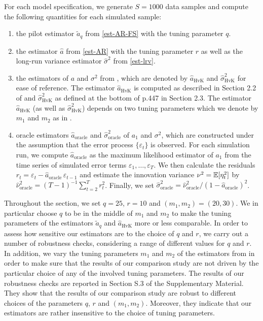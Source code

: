 For each model specification, we generate $S=1000$ data samples and compute the following quantities for each simulated sample: 
\begin{enumerate}[label=(\roman*),leftmargin=0.9cm]
\item the pilot estimator $\widetilde{a}_q$ from \eqref{est-AR-FS} with the tuning parameter $q$.
\item the estimator $\widehat{a}$ from \eqref{est-AR} with the tuning parameter $r$ as well as the long-run variance estimator $\widehat{\sigma}^2$ from \eqref{est-lrv}. 
\item the estimators of $a$ and $\sigma^2$ from \cite{Hall2003}, which are denoted by $\widehat{a}_{\text{HvK}}$ and $\widehat{\sigma}^2_{\text{HvK}}$ for ease of reference. The estimator $\widehat{a}_{\text{HvK}}$ is computed as described in Section 2.2 of \cite{Hall2003} and $\widehat{\sigma}^2_{\text{HvK}}$ as defined at the bottom of p.447 in Section 2.3. The estimator $\widehat{a}_{\text{HvK}}$ (as well as $\widehat{\sigma}^2_{\text{HvK}}$) depends on two tuning parameters which we denote by $m_1$ and $m_2$ as in \cite{Hall2003}. 
\item oracle estimators $\widehat{a}_{\text{oracle}}$ and $\widehat{\sigma}^2_{\text{oracle}}$ of $a_1$ and $\sigma^2$, which are constructed under the assumption that the error process $\{\varepsilon_t\}$ is observed. For each simulation run, we compute $\widehat{a}_{\text{oracle}}$ as the maximum likelihood estimator of $a_1$ from the time series of simulated error terms $\varepsilon_1,\ldots,\varepsilon_T$. We then calculate the residuals $r_t = \varepsilon_t - \widehat{a}_{\text{oracle}} \, \varepsilon_{t-1}$ and estimate the innovation variance $\nu^2 = \mathbb{E}[\eta_t^2]$ by $\widehat{\nu}_{\text{oracle}}^2 = (T-1)^{-1} \sum_{t=2}^T r_t^2$. Finally, we set $\widehat{\sigma}^2_{\text{oracle}} = \widehat{\nu}_{\text{oracle}}^2 / (1 - \widehat{a}_{\text{oracle}})^2$. 
\end{enumerate}
Throughout the section, we set $q = 25$, $r = 10$ and $(m_1,m_2) = (20,30)$. We in particular choose $q$ to be in the middle of $m_1$ and $m_2$ to make the tuning parameters of the estimators $\widetilde{a}_q$ and $\widehat{a}_{\text{HvK}}$ more or less comparable. In order to assess how sensitive our estimators are to the choice of $q$ and $r$, we carry out a number of robustness checks, considering a range of different values for $q$ and $r$. In addition, we vary the tuning parameters $m_1$ and $m_2$ of the estimators from \cite{Hall2003} in order to make sure that the results of our comparison study are not driven by the particular choice of any of the involved tuning parameters. The results of our robustness checks are reported in Section S.3 of the Supplementary Material. They show that the results of our comparison study are robust to %
different choices of the parameters $q$, $r$ and $(m_1,m_2)$. Moreover, they indicate that our estimators are rather insensitive to the choice of tuning parameters. 


